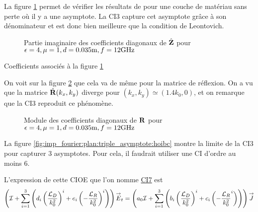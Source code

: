       La figure \ref{fig:imp_fourier:plan:soudais:hoibc} permet de vérifier les résultats de \cite[p.~11]{soudais_3d_2017} pour une couche de matériau sans perte où il y a une asymptote. La CI3 capture cet asymptote grâce à son dénominateur et est donc bien meilleure que la condition de Leontovich.
      \begin{figure}[!hbt]
          \centering
          
          \caption[CIOE sur empilement de P.~Soudais p.~11]{Partie imaginaire des coefficients diagonaux de \(\hat{\mathbf{Z}}\) pour \(\epsilon = 4, \mu = 1, d=0.035\text{m}, f=12\text{GHz}\)}
          \label{fig:imp_fourier:plan:soudais:hoibc}
      \end{figure}
      \begin{table}[!hbt]
        \centering
        \caption{Coefficients associés à la figure \ref{fig:imp_fourier:plan:soudais:hoibc}}
        \label{tab:imp_fourier:plan:soudais:hoibc}
      \end{table}

      On voit sur la figure \ref{fig:reflex_fourier:plan:soudais:hoibc} que cela va de même pour la matrice de réflexion. On a vu que la matrice \(\hat{\mathbf{R}}(k_x,k_y)\) diverge pour \((k_x,k_y)\simeq(1.4k_0,0)\), et on remarque que la CI3 reproduit ce phénomène.
      \begin{figure}[!hbt]
          \centering
          
          \caption[CIOE sur empilement de P.~Soudais p.~11]{Module des coefficients diagonaux de \(\mathbf{R}\) pour \(\epsilon = 4, \mu = 1, d=0.035\text{m}, f=12\text{GHz}\)}
          \label{fig:reflex_fourier:plan:soudais:hoibc}
      \end{figure}

      La figure \ref{fig:imp_fourier:plan:triple_asymptote:hoibc} montre la limite de la CI3 pour capturer 3 asymptotes. Pour cela, il faudrait utiliser une CI d'ordre au moins 6.

      L'expression de cette CIOE que l'on nomme \hyperlink{ci7}{CI7} est
      \begin{equation}
        \left({\mathcal{I}} + \sum_{i=1}^3 \left(d_{i} \left(\dfrac{{\mathcal{L}_D}}{k_0^2}\right)^i + e_{i} \left(-\dfrac{{\mathcal{L}_R}}{k_0^2}\right)^i \right)\right){\overset{\rightarrow}{E}}_t = \left(a_0 {\mathcal{I}} + \sum_{i=1}^3 \left(b_{i} \left(\dfrac{{\mathcal{L}_D}}{k_0^2}\right)^i + c_{i} \left(-\dfrac{{\mathcal{L}_R}}{k_0^2}^i\right) \right)\right){\overset{\rightarrow}{J}}
      \end{equation}

